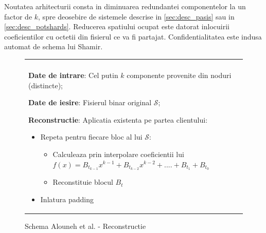 \documentclass{llncs}
\begin{document}
Noutatea arhitecturii consta in diminuarea redundantei componentelor la un factor de $k$, spre deosebire de sistemele descrise in \ref{sec:desc_pasis} sau in \ref{sec:desc_potshards}. Reducerea spatiului ocupat este datorat inlocuirii coeficientilor cu octetii din fisierul ce va fi partajat. Confidentialitatea este indusa automat de schema lui Shamir.

\begin{figure}[h!]

\begin{tabular}{|p{\textwidth}|}
\hline

\\
\hspace{.1in}
\textbf{Date de intrare}: Cel putin $k$ componente provenite din noduri (distincte);
\medskip

\hspace{.1in}
\textbf{Date de iesire}: Fisierul binar original $\mathcal{S}$;
\medskip

\hspace{.1in}
\textbf{Reconstructie}: Aplicatia existenta pe partea clientului: 
	\begin{itemize}
		\item Repeta pentru fiecare bloc al lui $\mathcal{S}$:
		\begin{itemize}
			\item Calculeaza prin interpolare coeficientii lui $f(x)=B_{t_{k - 1}}x ^ {k-1} + B_{t_{k - 2}}x ^ {k - 2} + .... + B_{t_1} + B_{t_0}$
			\item Reconstituie blocul $B_t$
		\end{itemize}
		\item Inlatura padding%
	\end{itemize}

\\
\hline
\end{tabular}
\caption{Schema Alouneh et al. - Reconstructie}
\label{fig:alouneh_reconstruction}
\end{figure}

\end{document}
